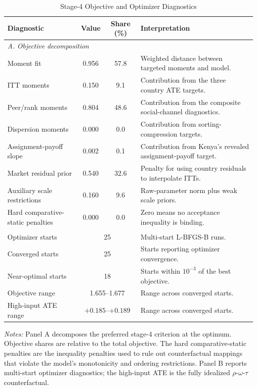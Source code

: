 \begin{table}[H]
\centering
\caption{Stage-4 Objective and Optimizer Diagnostics}
\label{tab:struct_stage4_discipline}
\begin{threeparttable}
\scriptsize
\setlength{\tabcolsep}{3pt}
\begin{tabular}[t]{lcc>{\raggedright\arraybackslash}p{5.7cm}}
\toprule
Diagnostic & Value & Share (\%) & Interpretation \\
\midrule
\multicolumn{4}{l}{\textit{A. Objective decomposition}} \\
Moment fit & 0.956 & 57.8 & Weighted distance between targeted moments and model. \\
ITT moments & 0.150 & 9.1 & Contribution from the three country ATE targets. \\
Peer/rank moments & 0.804 & 48.6 & Contribution from the composite social-channel diagnostics. \\
Dispersion moments & 0.000 & 0.0 & Contribution from sorting-compression targets. \\
Assignment-payoff slope & 0.002 & 0.1 & Contribution from Kenya's revealed assignment-payoff target. \\
Market residual prior & 0.540 & 32.6 & Penalty for using country residuals to interpolate ITTs. \\
Auxiliary scale restrictions & 0.160 & 9.6 & Raw-parameter norm plus weak scale priors. \\
Hard comparative-static penalties & 0.000 & 0.0 & Zero means no acceptance inequality is binding. \\
\addlinespace
\multicolumn{4}{l}{\textit{B. Numerical optimizer checks}} \\
Optimizer starts & \multicolumn{2}{c}{25} & Multi-start L-BFGS-B runs. \\
Converged starts & \multicolumn{2}{c}{25} & Starts reporting optimizer convergence. \\
Near-optimal starts & \multicolumn{2}{c}{18} & Starts within $10^{-3}$ of the best objective. \\
Objective range & \multicolumn{2}{c}{1.655--1.677} & Range across converged starts. \\
High-input ATE range & \multicolumn{2}{c}{$+0.185$--$+0.189$} & Range across converged starts. \\
\bottomrule
\end{tabular}
\begin{tablenotes}
\footnotesize
\item \textit{Notes:} Panel A decomposes the preferred stage-4 criterion at the optimum. Objective shares are relative to the total objective. The hard comparative-static penalties are the inequality penalties used to rule out counterfactual mappings that violate the model's monotonicity and ordering restrictions. Panel B reports multi-start optimizer diagnostics; the high-input ATE is the fully idealized $\rho$-$\omega$-$\tau$ counterfactual.
\end{tablenotes}
\end{threeparttable}
\end{table}
